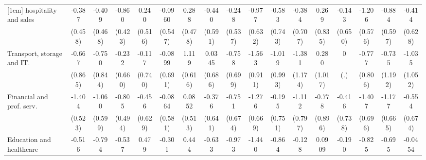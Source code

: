 {\begin{tabular}{l*{16}{c}}
[1em]
hospitality and sales&      -0.387         &      -0.409         &      -0.860\sym{*}  &       0.240         &     -0.0960         &       0.288         &      -0.440         &      -0.248         &      -0.977         &      -0.583         &      -0.384         &       0.269         &      -0.143         &      -1.206\sym{*}  &      -0.884         &      -0.414         \\
                    &     (0.458)         &     (0.468)         &     (0.423)         &     (0.516)         &     (0.547)         &     (0.478)         &     (0.591)         &     (0.537)         &     (0.632)         &     (0.743)         &     (0.707)         &     (0.835)         &     (0.650)         &     (0.576)         &     (0.597)         &     (0.628)         \\
[1em]
Transport, storage and IT.&      -0.667         &      -0.750         &      -0.232         &      -0.117         &     -0.0899         &       1.119         &      0.0345         &      -0.758         &      -1.563         &      -1.019         &      -1.381         &       0.280         &           0         &      -0.777         &      -0.735         &      -1.035         \\
                    &     (0.865)         &     (0.844)         &     (0.660)         &     (0.740)         &     (0.691)         &     (0.616)         &     (0.686)         &     (0.699)         &     (0.911)         &     (0.993)         &     (1.174)         &     (1.017)         &         (.)         &     (0.806)         &     (1.192)         &     (1.052)         \\
[1em]
Financial and prof. serv.&      -1.404\sym{**} &      -1.060         &      -0.805         &      -0.456         &     -0.0864         &      0.0852         &      -0.376         &      -0.751         &      -1.276         &      -0.195         &      -1.112         &      -0.778         &      -0.416         &      -1.407\sym{*}  &      -1.177         &      -0.554         \\
                    &     (0.523)         &     (0.599)         &     (0.494)         &     (0.629)         &     (0.581)         &     (0.513)         &     (0.641)         &     (0.674)         &     (0.669)         &     (0.751)         &     (0.797)         &     (0.896)         &     (0.738)         &     (0.696)         &     (0.665)         &     (0.674)         \\
[1em]
Education and healthcare&      -0.516         &      -0.794         &      -0.537         &       0.479         &      -0.301         &       0.444         &      -0.633         &      -0.973         &      -1.440\sym{*}  &      -0.864         &      -0.128         &      0.0909         &      -0.190         &      -0.825         &      -0.695         &     -0.0454         \\

\end{tabular}}
